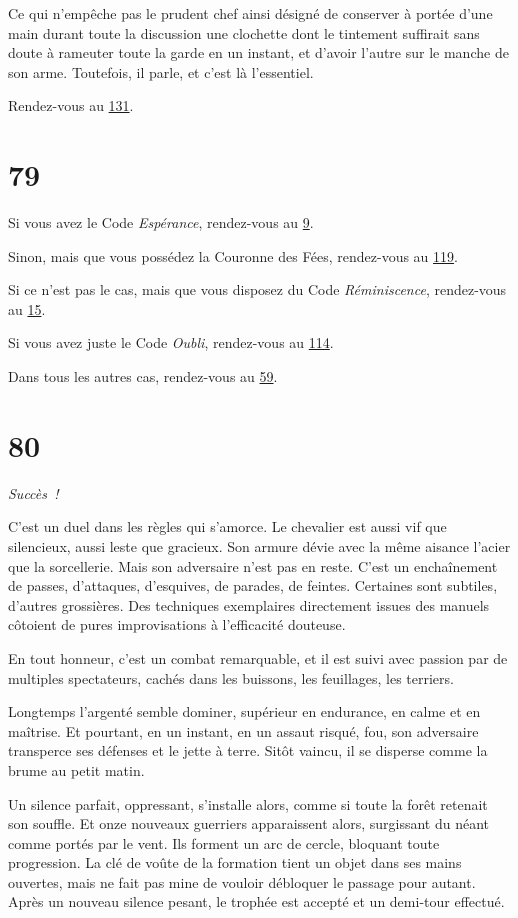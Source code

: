 \documentclass{report}
\newcommand{\gsection}[1]{
    \section{#1}
    \label{section-#1}
}
\newcommand{\glink}[1]{\hyperref[section-#1]{#1}}
\newcommand{\success}{\emph{Succès !}}
\begin{document}
Ce qui n'empêche pas le prudent chef ainsi désigné de conserver à portée d'une main durant toute la discussion une clochette dont le tintement suffirait sans doute à rameuter toute la garde en un instant, et d'avoir l'autre sur le manche de son arme. Toutefois, il parle, et c'est là l'essentiel.

Rendez-vous au \glink{131}.

\gsection{79}

Si vous avez le Code \emph{Espérance}, rendez-vous au \glink{9}.

Sinon, mais que vous possédez la Couronne des Fées, rendez-vous au \glink{119}.

Si ce n'est pas le cas, mais que vous disposez du Code \emph{Réminiscence}, rendez-vous au \glink{15}.

Si vous avez juste le Code \emph{Oubli}, rendez-vous au \glink{114}.

Dans tous les autres cas, rendez-vous au \glink{59}.

\gsection{80}

\success

C'est un duel dans les règles qui s'amorce. Le chevalier est aussi vif que silencieux, aussi leste que gracieux. Son armure dévie avec la même aisance l'acier que la sorcellerie. Mais son adversaire n'est pas en reste. C'est un enchaînement de passes, d'attaques, d'esquives, de parades, de feintes. Certaines sont subtiles, d'autres grossières. Des techniques exemplaires directement issues des manuels côtoient de pures improvisations à l'efficacité douteuse.

En tout honneur, c'est un combat remarquable, et il est suivi avec passion par de multiples spectateurs, cachés dans les buissons, les feuillages, les terriers.

Longtemps l'argenté semble dominer, supérieur en endurance, en calme et en maîtrise. Et pourtant, en un instant, en un assaut risqué, fou, son adversaire transperce ses défenses et le jette à terre. Sitôt vaincu, il se disperse comme la brume au petit matin.

Un silence parfait, oppressant, s'installe alors, comme si toute la forêt retenait son souffle. Et onze nouveaux guerriers apparaissent alors, surgissant du néant comme portés par le vent. Ils forment un arc de cercle, bloquant toute progression. La clé de voûte de la formation tient un objet dans ses mains ouvertes, mais ne fait pas mine de vouloir débloquer le passage pour autant. Après un nouveau silence pesant, le trophée est accepté et un demi-tour effectué.
\end{document}

